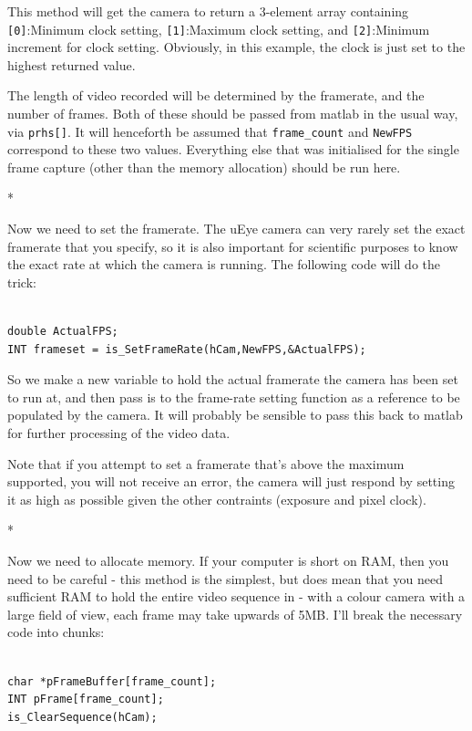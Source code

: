 \documentclass[12pt,a4paper]{article}
\begin{document}
This method will get the camera to return a 3-element array containing \texttt{[0]}:Minimum clock setting, \texttt{[1]}:Maximum clock setting, and \texttt{[2]}:Minimum increment for clock setting. Obviously, in this example, the clock is just set to the highest returned value.

The length of video recorded will be determined by the framerate, and the number of frames. Both of these should be passed from matlab in the usual way, via \texttt{prhs[]}. It will henceforth be assumed that \texttt{frame\_count} and \texttt{NewFPS} correspond to these two values. Everything else that was initialised for the single frame capture (other than the memory allocation) should be run here.

*

Now we need to set the framerate. The uEye camera can very rarely set the exact framerate that you specify, so it is also important for scientific purposes to know the exact rate at which the camera is running. The following code will do the trick:

\lstset{language=C++}
\begin{lstlisting}

double ActualFPS;
INT frameset = is_SetFrameRate(hCam,NewFPS,&ActualFPS);

\end{lstlisting}

So we make a new variable to hold the actual framerate the camera has been set to run at, and then pass is to the frame-rate setting function as a reference to be populated by the camera. It will probably be sensible to pass this back to matlab for further processing of the video data.

Note that if you attempt to set a framerate that's above the maximum supported, you will not receive an error, the camera will just respond by setting it as high as possible given the other contraints (exposure and pixel clock).

*

Now we need to allocate memory. If your computer is short on RAM, then you need to be careful - this method is the simplest, but does mean that you need sufficient RAM to hold the entire video sequence in - with a colour camera with a large field of view, each frame may take upwards of 5MB. I'll break the necessary code into chunks:

\lstset{language=C++}
\begin{lstlisting}

char *pFrameBuffer[frame_count];
INT pFrame[frame_count];
is_ClearSequence(hCam);

\end{lstlisting}
\end{document}
